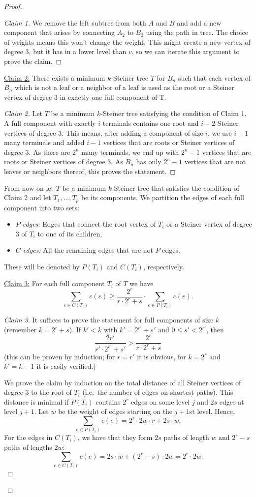 \documentclass[../skript.tex]{subfiles}
\begin{document}
\begin{proof}
\begin{proof}[Claim 1]
We remove the left subtree from both $A$ and $B$ and add a new component that arises by connecting $A_2$ to $B_2$ using the path in tree. The choice of weights means this won't change the weight. This might create a new vertex of degree 3, but it has in a lower level than $v$, so we can iterate this argument to prove the claim.
\end{proof}
\underline{Claim 2:} There exists a minimum $k$-Steiner tree $T$ for $B_n$ such that each vertex of $B_n$ which is not a leaf or a neighbor of a leaf is used as the root or a Steiner vertex of degree 3 in exactly one full component of T.
\begin{proof}[Claim 2]
Let $T$ be a minimum $k$-Steiner tree satisfying the condition of Claim 1. A full component with exactly $i$ terminals contains one root and $i-2$ Steiner vertices of degree 3. This means, after adding a component of size $i$, we use $i-1$ many terminals and added $i-1$ vertices that are roots or Steiner vertices of degree 3. 
As there are $2^n$ many terminals, we end up with $2^n-1$ vertices that are roots or Steiner vertices of degree 3. As $B_n$ has only $2^n - 1$ vertices that are not leaves or neighbors thereof, this proves the statement.
\end{proof}
From now on let $T$ be a minimum $k$-Steiner tree that satisfies the condition of Claim 2 and let $T_1, \ldots, T_p$ be its components.
We partition the edges of each full component into two sets:
\begin{itemize}
\item \emph{$P$-edges:} Edges that connect the root vertex of $T_i$ or a Steiner vertex of degree 3 of $T_i$ to one of its children,
\item \emph{$C$-edges:} All the remaining edges that are not $P$-edges.
\end{itemize}
These will be denoted by $P(T_i)$ and $C(T_i)$, respectively.

\underline{Claim 3:} For each full component $T_i$ of $T$ we have
\[
	\sum_{e \in C(T_i)} c(e) \geq \frac{2^r}{r \cdot 2^r + s} \cdot \sum_{e \in P(T_i)} c(e).
\]
\begin{proof}[Claim 3]
It suffices to prove the statement for full components of size $k$ (remember $k = 2^r + s$).
If $k' < k$ with $k' = 2^{r'} + s'$ and $0 \leq s' < 2^{r'}$, then
\[
	\frac{2r'}{r' \cdot 2^{r'} + s'} > \frac{2^r}{r \cdot 2^r + s}
\]
(this can be proven by induction; for $r = r'$ it is obvious, for $k = 2^r$ and $k' = k - 1$ it is easily verified.)

We prove the claim by induction on the total distance of all Steiner vertices of degree 3 to the root of $T_i$ (i.e.\ the number of edges on shortest paths). This distance is minimal if $P(T_i)$ contains $2^r$ edges on some level $j$ and $2s$ edges at level $j + 1$. Let $w$ be the weight of edges starting on the $j+1$st level. Hence,
\[
\sum_{e \in P(T_i)} c(e) = 2^r \cdot 2 w \cdot r + 2 s \cdot w.
\]
For the edges in $C(T_i)$, we have that they form $2s$ paths of length $w$ and $2^r - s$ paths of lengths $2w$:
\[
\sum_{e \in C(T_i)} c(e) = 2s \cdot w + \left( 2^r -s \right) \cdot 2w = 2^r \cdot 2 w.
\]


\end{proof}
\end{proof}
\end{document}
